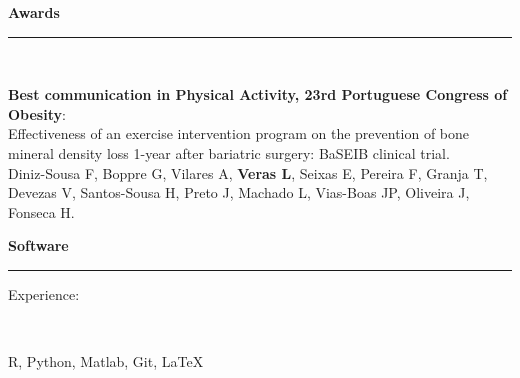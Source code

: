 \documentclass[10t]{article}
\begin{document}
\vspace{0.5em}

\noindent
{\large \textbf{Awards}} \\
\noindent \rule{\linewidth}{0.8pt}

\vspace{1em}

\noindent
\begin{minipage}[t]{0.15\linewidth}
\end{minipage}
\
\begin{minipage}[t]{0.85\linewidth}
\begin{minipage}[t]{\columnwidth}
	\textbf{Best communication in Physical Activity, 23rd Portuguese Congress of Obesity}: \\
	Effectiveness of an exercise intervention program on the prevention of bone mineral density loss 1-year after bariatric surgery: BaSEIB clinical trial. \\
	Diniz-Sousa F, Boppre G, Vilares A, \textbf{Veras L}, Seixas E, Pereira F, Granja T, Devezas V, Santos-Sousa H, Preto J, Machado L, Vias-Boas JP, Oliveira J, Fonseca H. 
\end{minipage}
\end{minipage}

\vspace{0.5em}

\noindent
{\large \textbf{Software}} \\
\noindent \rule{\linewidth}{0.8pt}

\vspace{1em}

\noindent
\begin{minipage}[t]{0.15\linewidth}
	\flushright	Experience:
\end{minipage}
\
\begin{minipage}[t]{0.85\linewidth}
\begin{minipage}[t]{\columnwidth}
	R, Python, Matlab, Git, \LaTeX
\end{minipage}
\end{minipage}

\vspace{0.5em}
\end{document}
